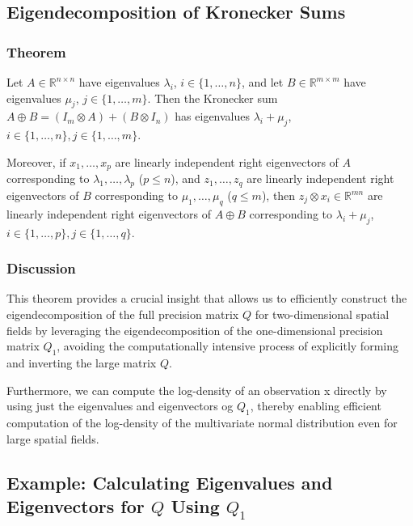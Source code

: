 \documentclass[journal=,manuscript=]{achemso}
\begin{document}
\subsection{Eigendecomposition of Kronecker
Sums}\label{eigendecomposition-of-kronecker-sums}

\subsubsection{Theorem}\label{theorem}

Let \(A \in \mathbb{R}^{n \times n}\) have eigenvalues \(\lambda_i\),
\(i \in \{1, \ldots, n\}\), and let \(B \in \mathbb{R}^{m \times m}\)
have eigenvalues \(\mu_j\), \(j \in \{1, \ldots, m\}\). Then the
Kronecker sum \(A \oplus B = (I_m \otimes A) + (B \otimes I_n)\) has
eigenvalues \(\lambda_i + \mu_j\),
\(i \in \{1, \ldots, n\}, j \in \{1, \ldots, m\}\).

Moreover, if \(x_1, \ldots, x_p\) are linearly independent right
eigenvectors of \(A\) corresponding to \(\lambda_1, \ldots, \lambda_p\)
(\(p \leq n\)), and \(z_1, \ldots, z_q\) are linearly independent right
eigenvectors of \(B\) corresponding to \(\mu_1, \ldots, \mu_q\)
(\(q \leq m\)), then \(z_j \otimes x_i \in \mathbb{R}^{mn}\) are
linearly independent right eigenvectors of \(A \oplus B\) corresponding
to \(\lambda_i + \mu_j\),
\(i \in \{1, \ldots, p\}, j \in \{1, \ldots, q\}\).

\subsubsection{Discussion}\label{discussion}

This theorem provides a crucial insight that allows us to efficiently
construct the eigendecomposition of the full precision matrix \(Q\) for
two-dimensional spatial fields by leveraging the eigendecomposition of
the one-dimensional precision matrix \(Q_1\), avoiding the
computationally intensive process of explicitly forming and inverting
the large matrix \(Q\).

Furthermore, we can compute the log-density of an observation x directly
by using just the eigenvalues and eigenvectors og \(Q_1\), thereby
enabling efficient computation of the log-density of the multivariate
normal distribution even for large spatial fields.

\subsection{\texorpdfstring{Example: Calculating Eigenvalues and
Eigenvectors for \(Q\) Using
\(Q_1\)}{Example: Calculating Eigenvalues and Eigenvectors for Q Using Q\_1}}\label{example-calculating-eigenvalues-and-eigenvectors-for-q-using-q_1}
\end{document}
